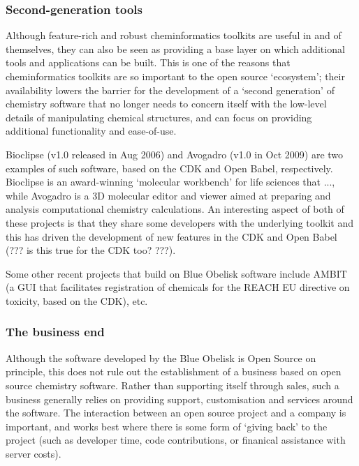 \documentclass[10pt]{bmc_article}
\newenvironment{bmcformat}{\begin{raggedright}\baselineskip20pt\sloppy\setboolean{publ}{false}}{\end{raggedright}\baselineskip20pt\sloppy}
\begin{document}
\begin{bmcformat}
\subsubsection*{Second-generation tools}

Although feature-rich and robust cheminformatics toolkits are useful
in and of themselves, they can also be seen as providing a base layer
on which additional tools and applications can be built. This is one of the reasons that cheminformatics toolkits are so important to the open source `ecosystem'; their availability lowers the barrier for the development of a `second generation' of chemistry software that no longer needs to concern itself with the low-level details of manipulating chemical structures, and can focus on providing additional functionality and ease-of-use.

Bioclipse \cite{Bioclipse2} (v1.0 released in Aug 2006) and Avogadro
\cite{WebAvogadro} (v1.0 in Oct 2009) are two examples of such software, based on the CDK and Open Babel, respectively. Bioclipse is an award-winning `molecular workbench' for life sciences that ..., while Avogadro is a 3D molecular editor and viewer aimed at preparing and analysis computational chemistry calculations. An interesting aspect of both of these projects is that they share some developers with the underlying toolkit and this has driven the development of new features in the CDK and Open Babel (??? is this true for the CDK too? ???).

Some other recent projects that build on Blue Obelisk software include AMBIT (a GUI that facilitates registration of chemicals for the REACH EU directive on toxicity, based on the CDK), etc.

\subsubsection*{The business end}

Although the software developed by the Blue Obelisk is Open Source on principle, this does not rule out the establishment of a business based on open source chemistry software. Rather than supporting itself through sales, such a business generally relies on providing support, customisation and services around the software. The interaction between an open source project and a company is important, and works best where there is some form of `giving back' to the project (such as developer time, code contributions, or finanical assistance with server costs).


\end{bmcformat}
\end{document}
